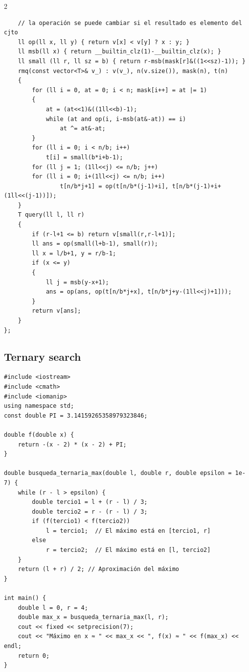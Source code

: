 \documentclass[twoside]{article}
\begin{document}
\begin{multicols*}{2}
\begin{verbatim}
    // la operación se puede cambiar si el resultado es elemento del cjto
    ll op(ll x, ll y) { return v[x] < v[y] ? x : y; }
    ll msb(ll x) { return __builtin_clz(1)-__builtin_clz(x); }
    ll small (ll r, ll sz = b) { return r-msb(mask[r]&((1<<sz)-1)); }
    rmq(const vector<T>& v_) : v(v_), n(v.size()), mask(n), t(n)
    {
        for (ll i = 0, at = 0; i < n; mask[i++] = at |= 1)
        {
            at = (at<<1)&((1ll<<b)-1);
            while (at and op(i, i-msb(at&-at)) == i)
                at ^= at&-at;
        }
        for (ll i = 0; i < n/b; i++)
            t[i] = small(b*i+b-1);
        for (ll j = 1; (1ll<<j) <= n/b; j++)
        for (ll i = 0; i+(1ll<<j) <= n/b; i++)
                t[n/b*j+1] = op(t[n/b*(j-1)+i], t[n/b*(j-1)+i+(1ll<<(j-1))]);
    }
    T query(ll l, ll r)
    {
        if (r-l+1 <= b) return v[small(r,r-l+1)];
        ll ans = op(small(l+b-1), small(r));
        ll x = l/b+1, y = r/b-1;
        if (x <= y)
        {
            ll j = msb(y-x+1);
            ans = op(ans, op(t[n/b*j+x], t[n/b*j+y-(1ll<<j)+1]));
        }
        return v[ans];
    }
};

\end{verbatim}

	{
		\subsection*{Ternary search}
	}
	\begin{verbatim}
#include <iostream>
#include <cmath>
#include <iomanip>
using namespace std;
const double PI = 3.14159265358979323846;

double f(double x) {
    return -(x - 2) * (x - 2) + PI; 
}

double busqueda_ternaria_max(double l, double r, double epsilon = 1e-7) {
    while (r - l > epsilon) {
        double tercio1 = l + (r - l) / 3;
        double tercio2 = r - (r - l) / 3;
        if (f(tercio1) < f(tercio2))
            l = tercio1;  // El máximo está en [tercio1, r]
        else
            r = tercio2;  // El máximo está en [l, tercio2]
    }
    return (l + r) / 2; // Aproximación del máximo
}

int main() {
    double l = 0, r = 4;
    double max_x = busqueda_ternaria_max(l, r);
    cout << fixed << setprecision(7);
    cout << "Máximo en x ≈ " << max_x << ", f(x) ≈ " << f(max_x) << endl;
    return 0;
}

\end{verbatim}

\end{multicols*}
\end{document}
